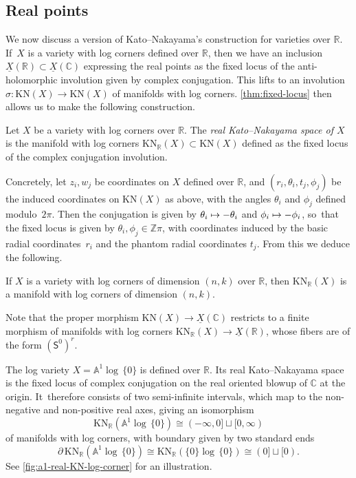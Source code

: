 \documentclass[JEP,XML,SOM,Unicode,NoFloatCountersInSection,published]{cedram}
\newcommand\mto{\mathchoice{\longmapsto}{\mapsto}{\mapsto}{\mapsto}}
\theoremstyle{definition}
\theoremstyle{remark}
\newenvironment{example}
  {\pushQED{\qed}\renewcommand{\qedsymbol}{$\lozenge$}\examplex}
  {\popQED\endexamplex}
\let\defn\emph
\newcommand{\CC}{\mathbb{C}}
\newcommand{\RR}{\mathbb{R}}
\newcommand{\ZZ}{\mathbb{Z}}
\newcommand{\AF}{\mathbb{A}}
\newcommand{\logcyl}{\AF^1 \log\, \{0\}}
\newcommand{\logcirc}{\{0\} \log\, \{0\}}
\newcommand{\rbrac}[1]{\left(#1\right)}
\newcommand{\uX}{\underline{X}}
\newcommand{\KN}[1]{\mathrm{KN}(#1)}
\newcommand{\KNR}[1]{\mathrm{KN}_\RR\rbrac{#1}}
\begin{document}
\subsection{Real points}\label{sec:real-KN} We now discuss a version of Kato--Nakayama's construction for varieties over $\RR$. If~$X$ is a variety with log corners defined over $\RR$, then we have an inclusion $\uX(\RR)\subset \uX(\CC)$ expressing the real points as the fixed locus of the anti-holomorphic involution given by complex conjugation. This lifts to an involution $\sigma \colon \KN{X} \to \KN{X}$ of manifolds with log corners. \autoref{thm:fixed-locus} then allows us to make the following construction.

\begin{definition}
Let $X$ be a variety with log corners over $\RR$. The \defn{real Kato--Nakayama space of $X$} is the manifold with log corners $\KNR{X} \subset \KN{X}$ defined as the fixed locus of the complex conjugation involution.
\end{definition}

Concretely, let $z_i,w_j$ be coordinates on $X$ defined over $\RR$, and $(r_i,\theta_i,t_j,\phi_j)$ be the induced coordinates on $\KN{X}$ as above, with the angles $\theta_i$ and $\phi_j$ defined modulo~$2\pi$. Then the conjugation is given by $\theta_i \mto - \theta_i$ and $\phi_i \mto -\phi_i$, so~that the fixed locus is given by $\theta_i,\phi_j \in \ZZ\pi$, with coordinates induced by the basic radial coordinates~$r_i$ and the phantom radial coordinates $t_j$. From this we deduce the following.

\begin{corollary}
If $X$ is a variety with log corners of dimension $(n,k)$ over $\RR$, then $\KNR{X}$ is a manifold with log corners of dimension $(n,k)$.
\end{corollary}

Note that the proper morphism $\KN{X}\to \uX(\CC)$ restricts to a finite morphism of manifolds with log corners $\KNR{X}\to \uX(\RR)$, whose fibers are of the form $(\mathsf{S}^0)^r$.

\begin{example}
The log variety $X = \logcyl$ is defined over $\RR$. Its real Kato--Nakayama space is the fixed locus of complex conjugation on the real oriented blowup of $\CC$ at the origin. It~therefore consists of two semi-infinite intervals, which map to the non-negative and non-positive real axes, giving an isomorphism
\[
\KNR{\logcyl} \cong (-\infty,0] \sqcup [0,\infty)
\]
of manifolds with log corners, with boundary given by two standard ends
\[
\partial\,\KNR{\logcyl} \cong \KNR{\logcirc} \cong (0] \sqcup [0).
\]
See \autoref{fig:a1-real-KN-log-corner} for an illustration.
\end{example}
\end{document}
